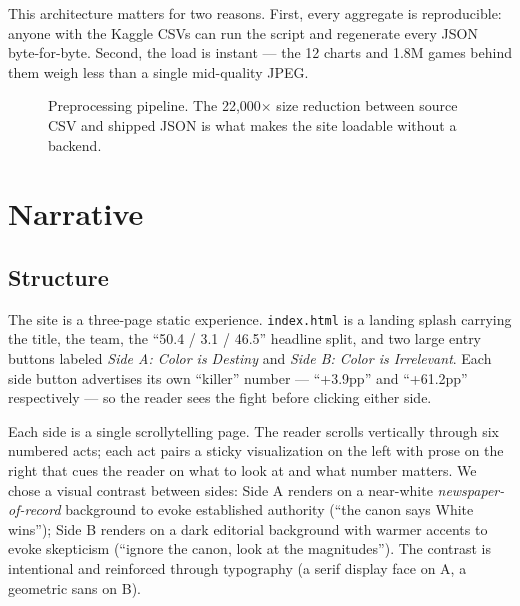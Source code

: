 \documentclass[sigconf,nonacm,natbib=false]{acmart}
\begin{document}
This architecture matters for two reasons. First, every aggregate
is reproducible: anyone with the Kaggle CSVs can run the script
and regenerate every JSON byte-for-byte. Second, the load is
instant --- the 12 charts and 1.8M games behind them weigh less
than a single mid-quality JPEG.

\begin{figure}[t]
\centering
{}
\caption{Preprocessing pipeline. The 22{,}000$\times$ size reduction
between source CSV and shipped JSON is what makes the site loadable
without a backend.}
\label{fig:pipeline}
\end{figure}

\section{Narrative}

\subsection{Structure}

The site is a three-page static experience. \texttt{index.html}
is a landing splash carrying the title, the team, the
``50.4 / 3.1 / 46.5'' headline split, and two large entry buttons
labeled \emph{Side A: Color is Destiny} and \emph{Side B: Color is
Irrelevant}. Each side button advertises its own ``killer'' number
--- ``+3.9pp'' and ``+61.2pp'' respectively --- so the reader sees
the fight before clicking either side.

Each side is a single scrollytelling page. The reader scrolls
vertically through six numbered acts; each act pairs a sticky
visualization on the left with prose on the right that cues the
reader on what to look at and what number matters. We chose a
visual contrast between sides: Side A renders on a near-white
\emph{newspaper-of-record} background to evoke established
authority (``the canon says White wins''); Side B renders on a
dark editorial background with warmer accents to evoke skepticism
(``ignore the canon, look at the magnitudes''). The contrast is
intentional and reinforced through typography (a serif display
face on A, a geometric sans on B).
\end{document}
